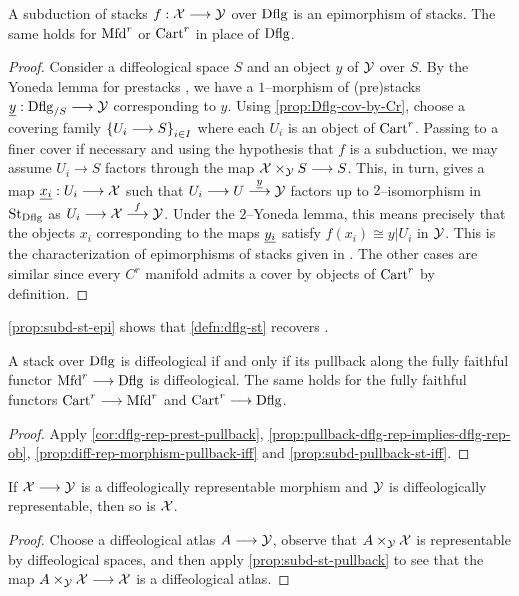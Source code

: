 \documentclass[11pt]{amsart}
\begin{document}
\begin{prop}\label{prop:subd-st-epi}
A subduction of stacks $f : \mcX \to \mcY$ over $\mathrm{Dflg}$ is an epimorphism of stacks.
The same holds for $\mathrm{Mfd}^r$ or $\mathrm{Cart}^r$ in place of $\mathrm{Dflg}$.
\end{prop}
\begin{proof}
Consider a diffeological space $S$ and an object $y$ of $\mathcal{Y}$ over $S$.
By the Yoneda lemma for prestacks \cite[Lemma 2.4.21]{AlperModuli}, we have
a $1$--morphism of (pre)stacks $\ul{y} : \Dflg_{/S} \to \mcY$ corresponding to $y$.
Using \cref{prop:Dflg-cov-by-Cr}, choose a covering family $\set{U_i \to S}_{i \in I}$
where each $U_i$ is an object of $\mathrm{Cart}^r$.
Passing to a finer cover if necessary and using the hypothesis that $f$ is a subduction, we may
assume $U_i \to S$ factors through the map $\mcX \times_\mcY S \to S$. This, in turn, gives
a map $\ul{x_i} : U_i \to \mcX$ such that $U_i \to U \to[\ul{y}] \mcY$ factors up to
$2$--isomorphism in $\mathrm{St}_{\mathrm{Dflg}}$ as $U_i \to \mcX \to[f] \mcY$.
Under the $2$--Yoneda lemma, this means precisely that the objects $x_i$ corresponding
to the maps $\underline{y_i}$ satisfy $f(x_i) \cong y|U_i$ in $\mathcal{Y}$.
This is the characterization of epimorphisms of stacks given in \cite[Proposition 2.13(ii)]{BX11}.
The other cases are similar since every $C^r$ manifold admits a cover by objects of $\mathrm{Cart}^r$
by definition.
\end{proof}

\begin{rmk}
\cref{prop:subd-st-epi} shows that \cref{defn:dflg-st} recovers
\cite[Definition 2.9 and following paragraphs]{RV18}.
\end{rmk}

\begin{prop}\label{prop:dflg-st-pullback-iff}
A stack over $\mathrm{Dflg}$ is diffeological if and only if its pullback along the fully faithful functor
$\Mfd^r \to \Dflg$ is diffeological. The same holds for the fully faithful functors
$\Cart^r \to \Mfd^r$ and $\Cart^r \to \Dflg$.
\end{prop}
\begin{proof}
Apply \cref{cor:dflg-rep-prest-pullback}, \cref{prop:pullback-dflg-rep-implies-dflg-rep-ob},
\cref{prop:diff-rep-morphism-pullback-iff} and \cref{prop:subd-pullback-st-iff}.
\end{proof}

\begin{cor}\label{cor:dflg-rep-morphism-dflg-target}
If $\mcX \to \mcY$ is a diffeologically representable morphism and $\mathcal{Y}$ is diffeologically
representable, then so is $\mathcal{X}$.
\end{cor}
\begin{proof}
Choose a diffeological atlas $A \to \mcY$, observe that $A \times_\mathcal{Y} \mathcal{X}$ is representable
by diffeological spaces, and then apply \cref{prop:subd-st-pullback}
to see that the map $A \times_\mcY \mcX \to \mcX$ is a diffeological atlas.
\end{proof}
\end{document}

